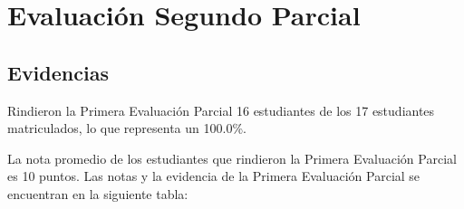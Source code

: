 \chapter{Evaluación Segundo Parcial}
\newpage

%



\pagestyle{empty} %

\section{Evidencias}
Rindieron la Primera Evaluación Parcial 16 estudiantes de los 17 estudiantes matriculados, lo que representa un 100.0\%.

La nota promedio de los estudiantes que rindieron la Primera Evaluación Parcial es 10 puntos. Las notas y la evidencia de la Primera Evaluación Parcial se encuentran en la siguiente tabla:


